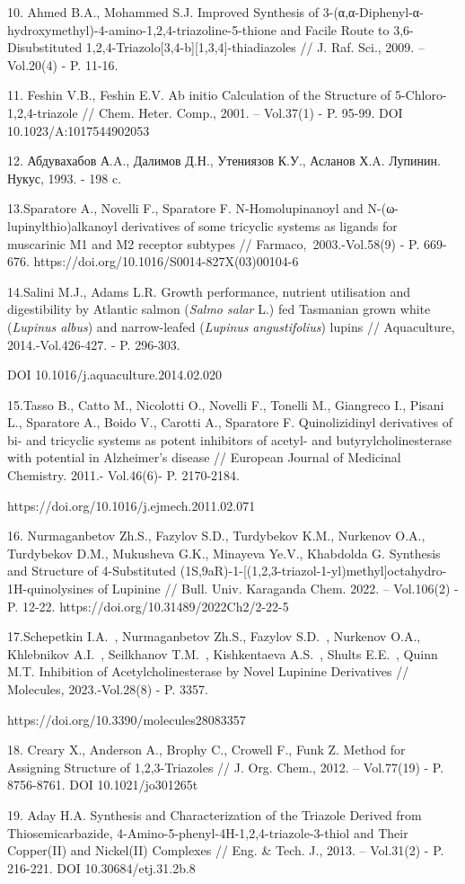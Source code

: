 \begin{noparindent}
10. Ahmed B.A., Mohammed S.J. Improved Synthesis of
3-(α,α-Diphenyl-α-hydroxymethyl)-4-amino-1,2,4-triazoline-5-thione and
Facile Route to 3,6-Disubstituted
1,2,4-Triazolo{[}3,4-b{]}{[}1,3,4{]}-thiadiazoles // J. Raf. Sci., 2009.
-- Vol.20(4) - P. 11-16.

11. Feshin V.B., Feshin E.V. Ab initio Calculation of the Structure of
5-Chloro-1,2,4-triazole // Chem. Heter. Comp., 2001. -- Vol.37(1) - P.
95-99. DOI 10.1023/A:1017544902053

12. Абдувахабов А.A., Далимов Д.Н., Утениязов К.У., Асланов Х.A.
Лупинин. Нукус, 1993. - 198 c.

13.Sparatore A., Novelli F., Sparatore F. N-Homolupinanoyl and
N-(ω-lupinylthio)alkanoyl derivatives of some tricyclic systems as
ligands for muscarinic M1 and M2 receptor subtypes //
Farmaco,~2003.-Vol.58(9) - P. 669-676.
https://doi.org/10.1016/S0014-827X(03)00104-6

14.Salini M.J., Adams L.R. Growth performance, nutrient utilisation and
digestibility by Atlantic salmon (\emph{Salmo salar} L.) fed Tasmanian
grown white (\emph{Lupinus albus}) and narrow-leafed (\emph{Lupinus}
\emph{angustifolius}) lupins // Aquaculture, 2014.-Vol.426-427. - P.
296-303.

DOI 10.1016/j.aquaculture.2014.02.020

15.Tasso B., Catto M., Nicolotti O., Novelli F., Tonelli M., Giangreco
I., Pisani L., Sparatore A., Boido V., Carotti A., Sparatore F.
Quinolizidinyl derivatives of bi- and tricyclic systems as potent
inhibitors of acetyl- and butyrylcholinesterase with potential in
Alzheimer's disease // European Journal of Medicinal Chemistry. 2011.-
Vol.46(6)- P. 2170-2184.

https://doi.org/10.1016/j.ejmech.2011.02.071

16. Nurmaganbetov Zh.S., Fazylov S.D., Turdybekov K.M., Nurkenov O.A.,
Turdybekov D.M., Mukusheva G.K., Minayeva Ye.V., Khabdolda G. Synthesis
and Structure of 4-Substituted
(1S,9aR)-1-{[}(1,2,3-triazol-1-yl)methyl{]}octahydro-1H-quinolysines of
Lupinine // Bull. Univ. Karaganda Chem. 2022. -- Vol.106(2) - P. 12-22.
https://doi.org/10.31489/2022Ch2/2-22-5

17.Schepetkin I.A.~, Nurmaganbetov Zh.S., Fazylov S.D.~, Nurkenov O.A.,
Khlebnikov A.I.~, Seilkhanov T.M.~, Kishkentaeva A.S.~, Shults E.E.~,
Quinn M.T. Inhibition of Acetylcholinesterase by Novel Lupinine
Derivatives // Molecules\emph{,} 2023.-Vol.28(8) - P. 3357.

https://doi.org/10.3390/molecules28083357

18. Creary X., Anderson A., Brophy C., Crowell F., Funk Z. Method for
Assigning Structure of 1,2,3-Triazoles // J. Org. Chem., 2012. --
Vol.77(19) - P. 8756-8761. DOI 10.1021/jo301265t

19. Aday H.A. Synthesis and Characterization of the Triazole Derived
from Thiosemicarbazide, 4-Amino-5-phenyl-4H-1,2,4-triazole-3-thiol and
Their Copper(II) and Nickel(II) Complexes // Eng. \& Tech. J., 2013. --
Vol.31(2) - P. 216-221. DOI 10.30684/etj.31.2b.8
\end{noparindent}

